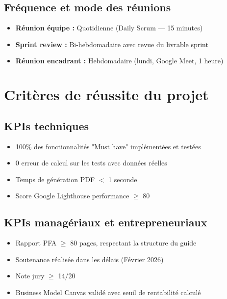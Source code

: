 \documentclass[12pt,a4paper]{report}
\begin{document}
\subsection{Fréquence et mode des réunions}

\begin{itemize}
    \item \textbf{Réunion équipe :} Quotidienne (Daily Scrum — 15 minutes)
    \item \textbf{Sprint review :} Bi-hebdomadaire avec revue du livrable sprint
    \item \textbf{Réunion encadrant :} Hebdomadaire (lundi, Google Meet, 1 heure)
\end{itemize}

\section{Critères de réussite du projet}

\subsection{KPIs techniques}

\begin{itemize}
    \item 100\% des fonctionnalités "Must have" implémentées et testées
    \item 0 erreur de calcul sur les tests avec données réelles
    \item Temps de génération PDF $<$ 1 seconde
    \item Score Google Lighthouse performance $\geq$ 80
\end{itemize}

\subsection{KPIs managériaux et entrepreneuriaux}

\begin{itemize}
    \item Rapport PFA $\geq$ 80 pages, respectant la structure du guide
    \item Soutenance réalisée dans les délais (Février 2026)
    \item Note jury $\geq$ 14/20
    \item Business Model Canvas validé avec seuil de rentabilité calculé
\end{itemize}

\end{document}
